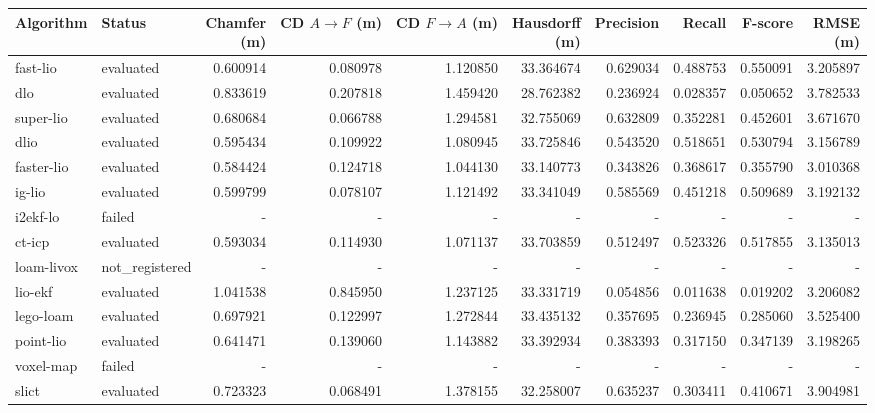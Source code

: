 \documentclass{article}
\begin{document}
\vspace*{\fill}

\begin{table}[htbp]
\centering
\small
\setlength{\tabcolsep}{3pt}
\begin{tabular}{llrrrrrrrr}
\hline
Algorithm & Status & \shortstack{Chamfer\\(m)} & \shortstack{CD $A \to F$\\(m)} & \shortstack{CD $F \to A$\\(m)} & \shortstack{Hausdorff\\(m)} & Precision & Recall & F-score & \shortstack{RMSE\\(m)} \\
\hline
fast-lio & evaluated & 0.600914 & 0.080978 & 1.120850 & 33.364674 & 0.629034 & 0.488753 & 0.550091 & 3.205897 \\
dlo & evaluated & 0.833619 & 0.207818 & 1.459420 & 28.762382 & 0.236924 & 0.028357 & 0.050652 & 3.782533 \\
super-lio & evaluated & 0.680684 & 0.066788 & 1.294581 & 32.755069 & 0.632809 & 0.352281 & 0.452601 & 3.671670 \\
dlio & evaluated & 0.595434 & 0.109922 & 1.080945 & 33.725846 & 0.543520 & 0.518651 & 0.530794 & 3.156789 \\
faster-lio & evaluated & 0.584424 & 0.124718 & 1.044130 & 33.140773 & 0.343826 & 0.368617 & 0.355790 & 3.010368 \\
ig-lio & evaluated & 0.599799 & 0.078107 & 1.121492 & 33.341049 & 0.585569 & 0.451218 & 0.509689 & 3.192132 \\
i2ekf-lo & failed & - & - & - & - & - & - & - & - \\
ct-icp & evaluated & 0.593034 & 0.114930 & 1.071137 & 33.703859 & 0.512497 & 0.523326 & 0.517855 & 3.135013 \\
loam-livox & not\_registered & - & - & - & - & - & - & - & - \\
lio-ekf & evaluated & 1.041538 & 0.845950 & 1.237125 & 33.331719 & 0.054856 & 0.011638 & 0.019202 & 3.206082 \\
lego-loam & evaluated & 0.697921 & 0.122997 & 1.272844 & 33.435132 & 0.357695 & 0.236945 & 0.285060 & 3.525400 \\
point-lio & evaluated & 0.641471 & 0.139060 & 1.143882 & 33.392934 & 0.383393 & 0.317150 & 0.347139 & 3.198265 \\
voxel-map & failed & - & - & - & - & - & - & - & - \\
slict & evaluated & 0.723323 & 0.068491 & 1.378155 & 32.258007 & 0.635237 & 0.303411 & 0.410671 & 3.904981 \\

\end{tabular}
\end{table}
\end{document}
